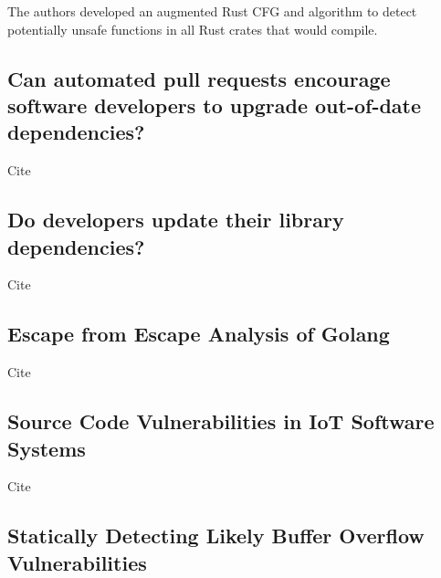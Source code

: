 The authors developed an augmented Rust CFG and algorithm to detect potentially unsafe functions in all Rust crates that
would compile.



\subsection{Can automated pull requests encourage software developers to upgrade out-of-date dependencies?}
\label{subsec:can-automated-pull-requests-encourage-software-developers-to-upgrade-out-of-date-dependencies?}

Cite~\cite{mirhosseini2017}



\subsection{Do developers update their library dependencies?}
\label{subsec:do-developers-update-their-library-dependencies?}

Cite~\cite{kula2017}



\subsection{Escape from Escape Analysis of Golang}
\label{subsec:escape-from-escape-analysis-of-golang}

Cite~\cite{wang2020}



\subsection{Source Code Vulnerabilities in IoT Software Systems}
\label{subsec:source-code-vulnerabilities-in-iot-software-systems}

Cite~\cite{alnaeli2017}



\subsection{Statically Detecting Likely Buffer Overflow Vulnerabilities}
\label{subsec:statically-detecting-likely-buffer-overflow-vulnerabilities}

